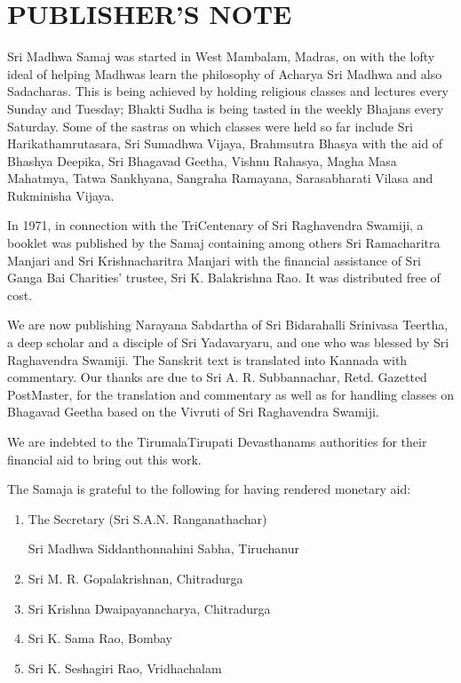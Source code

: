 
\chapter*{PUBLISHER'S NOTE}

\vskip -7pt

Sri Madhwa Samaj was started in West Mambalam, Madras, on  with the lofty ideal of helping Madhwas learn the philosophy of Acharya Sri Madhwa and also Sadacharas. This is being achieved by holding religious classes and lectures every Sunday and Tuesday; Bhakti Sudha is being tasted in the weekly Bhajans every Saturday. Some of the sastras on which classes were held so far include Sri Harikathamrutasara, Sri Sumadhwa Vijaya, Brahmsutra Bhasya with the aid of Bhashya Deepika, Sri Bhagavad Geetha, Vishnu Rahasya, Magha Masa Mahatmya, Tatwa Sankhyana, Sangraha Ramayana, Sarasabharati Vilasa and Rukminisha Vijaya.

\vskip -1pt

In 1971, in connection with the TriCentenary of Sri Raghavendra Swamiji, a booklet was published by the Samaj containing among others Sri Ramacharitra Manjari and Sri Krishnacharitra Manjari with the financial assistance of Sri Ganga Bai Charities' trustee, Sri K. Balakrishna Rao. It was distributed free of cost.

\vskip -1pt

We are now publishing Narayana Sabdartha of Sri Bidarahalli Srinivasa Teertha, a deep scholar and a disciple of Sri Yadavaryaru, and one who was blessed by Sri Raghavendra Swamiji. The Sanskrit text is translated into Kannada with commentary. Our thanks are due to Sri A. R. Subbannachar, Retd. Gazetted PostMaster, for the translation and commentary as well as for handling classes on Bhagavad Geetha based on the Vivruti of Sri Raghavendra Swamiji.

We are indebted to the TirumalaTirupati Devasthanams authorities for their financial aid to bring out this work.

The Samaja is grateful to the following for having rendered monetary aid:

\begin{enumerate}
\item 
 The Secretary (Sri S.A.N. Ranganathachar)

 Sri Madhwa Siddanthonnahini Sabha, Tiruchanur

 \item Sri M. R. Gopalakrishnan, Chitradurga

 \item Sri Krishna Dwaipayanacharya, Chitradurga

 \item Sri K. Sama Rao, Bombay

 \item Sri K. Seshagiri Rao, Vridhachalam

\end{enumerate}

